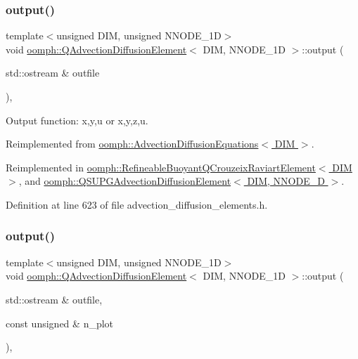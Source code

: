 \subsubsection{\texorpdfstring{output()}{output()}\hspace{0.1cm}{\footnotesize\ttfamily [1/4]}}
{\footnotesize\ttfamily template$<$unsigned D\+IM, unsigned N\+N\+O\+D\+E\+\_\+1D$>$ \\
void \hyperlink{classoomph_1_1QAdvectionDiffusionElement}{oomph\+::\+Q\+Advection\+Diffusion\+Element}$<$ D\+IM, N\+N\+O\+D\+E\+\_\+1D $>$\+::output (\begin{DoxyParamCaption}\item[{std\+::ostream \&}]{outfile }\end{DoxyParamCaption})\hspace{0.3cm}{\ttfamily [inline]}, {\ttfamily [virtual]}}



Output function\+: x,y,u or x,y,z,u. 



Reimplemented from \hyperlink{classoomph_1_1AdvectionDiffusionEquations_a3016c7a56e7f7178b4d9ae8604d0c10b}{oomph\+::\+Advection\+Diffusion\+Equations$<$ D\+I\+M $>$}.



Reimplemented in \hyperlink{classoomph_1_1RefineableBuoyantQCrouzeixRaviartElement_abbe05b977edbfec7752ed417b90e09fa}{oomph\+::\+Refineable\+Buoyant\+Q\+Crouzeix\+Raviart\+Element$<$ D\+I\+M $>$}, and \hyperlink{classoomph_1_1QSUPGAdvectionDiffusionElement_a13469ca1c2520461e62374e600ecf84d}{oomph\+::\+Q\+S\+U\+P\+G\+Advection\+Diffusion\+Element$<$ D\+I\+M, N\+N\+O\+D\+E\+\_\+D $>$}.



Definition at line 623 of file advection\+\_\+diffusion\+\_\+elements.\+h.

\mbox{\label{classoomph_1_1QAdvectionDiffusionElement_a248d31c455b267075d437ae2833540c6}} 
\subsubsection{\texorpdfstring{output()}{output()}\hspace{0.1cm}{\footnotesize\ttfamily [2/4]}}
{\footnotesize\ttfamily template$<$unsigned D\+IM, unsigned N\+N\+O\+D\+E\+\_\+1D$>$ \\
void \hyperlink{classoomph_1_1QAdvectionDiffusionElement}{oomph\+::\+Q\+Advection\+Diffusion\+Element}$<$ D\+IM, N\+N\+O\+D\+E\+\_\+1D $>$\+::output (\begin{DoxyParamCaption}\item[{std\+::ostream \&}]{outfile,  }\item[{const unsigned \&}]{n\+\_\+plot }\end{DoxyParamCaption})\hspace{0.3cm}{\ttfamily [inline]}, {\ttfamily [virtual]}}



